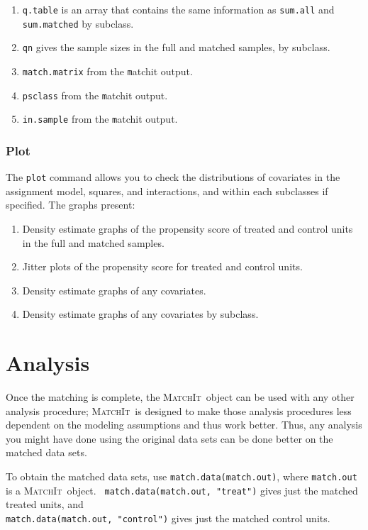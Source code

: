 \documentclass[oneside,letterpaper,titlepage]{article}
\newcommand{\MatchIt}{\textsc{MatchIt}}
\begin{document}
\begin{enumerate}
\item \texttt{q.table} is an array that contains the same information
  as \texttt{sum.all} and \texttt{sum.matched} by subclass.
  
\item \texttt{qn} gives the sample sizes in the full and matched
  samples, by subclass.
\item \texttt{match.matrix} from the {\texttt matchit} output.
\item \texttt{psclass} from the {\texttt matchit} output.
\item \texttt{in.sample} from the {\texttt matchit} output.
\end{enumerate}

\subsubsection{Plot}
The \texttt{plot} command allows you to check the distributions of
covariates in the assignment model, squares, and interactions, and
within each subclasses if specified.  The graphs present:
\begin{enumerate}
\item Density estimate graphs of the propensity score of treated and
  control units in the full and matched samples.
\item Jitter plots of the propensity score for treated and control
  units.
\item Density estimate graphs of any covariates.
\item Density estimate graphs of any covariates by subclass.
\end{enumerate}

\section{Analysis}

Once the matching is complete, the \MatchIt\ object can be used with
any other analysis procedure; \MatchIt\ is designed to make those
analysis procedures less dependent on the modeling assumptions and
thus work better.  Thus, any analysis you might have done using the
original data sets can be done better on the matched data sets.

To obtain the matched data sets, use {\tt match.data(match.out)},
where {\tt match.out} is a \MatchIt\ object.  {\tt
  match.data(match.out, "treat")} gives just the matched treated
units, and  \\ {\tt match.data(match.out, "control")} gives just the
matched control units.
\end{document}
